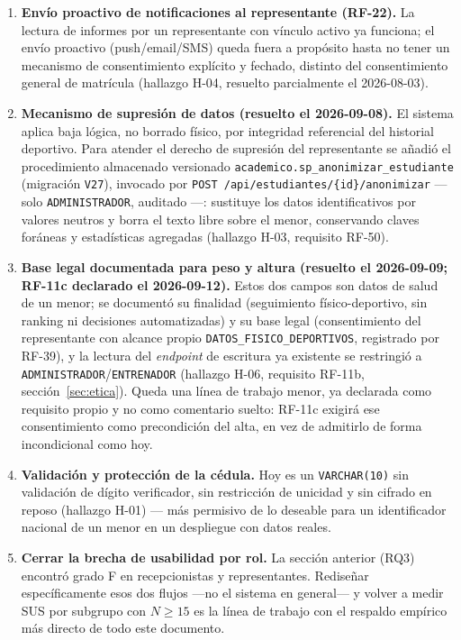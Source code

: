 \documentclass[11pt,a4paper]{article}
\begin{document}
\begin{enumerate}[leftmargin=*]
  \item \textbf{Envío proactivo de notificaciones al representante
    (RF-22).} La lectura de informes por un representante con vínculo
    activo ya funciona; el envío proactivo (push/email/SMS) queda fuera a
    propósito hasta no tener un mecanismo de consentimiento explícito y
    fechado, distinto del consentimiento general de matrícula (hallazgo
    H-04, resuelto parcialmente el 2026-08-03).
  \item \textbf{Mecanismo de supresión de datos (resuelto el 2026-09-08).}
    El sistema aplica baja lógica, no borrado físico, por integridad
    referencial del historial deportivo. Para atender el derecho de
    supresión del representante se añadió el procedimiento almacenado
    versionado \texttt{academico.sp\_anonimizar\_estudiante} (migración
    \texttt{V27}), invocado por \texttt{POST /api/estudiantes/\{id\}/anonimizar}
    — solo \texttt{ADMINISTRADOR}, auditado —: sustituye los datos
    identificativos por valores neutros y borra el texto libre sobre el
    menor, conservando claves foráneas y estadísticas agregadas
    (hallazgo H-03, requisito RF-50).
  \item \textbf{Base legal documentada para peso y altura (resuelto el
    2026-09-09; RF-11c declarado el 2026-09-12).} Estos dos campos son
    datos de salud de un menor; se documentó su finalidad (seguimiento
    físico-deportivo, sin ranking ni decisiones automatizadas) y su base
    legal (consentimiento del representante con alcance propio
    \texttt{DATOS\_FISICO\_DEPORTIVOS}, registrado por RF-39), y la
    lectura del \emph{endpoint} de escritura ya existente se restringió a
    \texttt{ADMINISTRADOR}/\texttt{ENTRENADOR} (hallazgo H-06, requisito
    RF-11b, sección~\ref{sec:etica}). Queda una línea de trabajo menor,
    ya declarada como requisito propio y no como comentario suelto: RF-11c
    exigirá ese consentimiento como precondición del alta, en vez de
    admitirlo de forma incondicional como hoy.
  \item \textbf{Validación y protección de la cédula.} Hoy es un
    \texttt{VARCHAR(10)} sin validación de dígito verificador, sin
    restricción de unicidad y sin cifrado en reposo (hallazgo H-01) — más
    permisivo de lo deseable para un identificador nacional de un menor en
    un despliegue con datos reales.
  \item \textbf{Cerrar la brecha de usabilidad por rol.} La sección
    anterior (RQ3) encontró grado F en recepcionistas y representantes.
    Rediseñar específicamente esos dos flujos —no el sistema en general— y
    volver a medir SUS por subgrupo con $N \geq 15$ es la línea de trabajo
    con el respaldo empírico más directo de todo este documento.
\end{enumerate}
\end{document}

